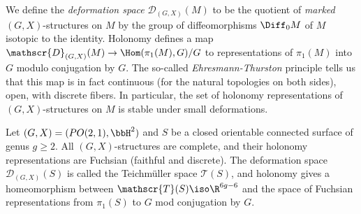 \documentclass{article}
\begin{document}
We define the \textit{deformation space} $\mathscr{D}_{(G,X)}(M)$ to be the quotient of \textit{marked} $(G,X)$-structures on $M$ by the group of diffeomorphisms $\Diff_0M$ of $M$ isotopic to the identity. Holonomy defines a map $\mathscr{D}_{(G,X)}(M) \to \Hom(\pi_1(M),G)/G$ to representations of $\pi_1(M)$ into $G$ modulo conjugation by $G$. The so-called \textit{Ehresmann-Thurston} principle tells us that this map is in fact continuous (for the natural topologies on both sides), open, with discrete fibers. In particular, the set of holonomy representations of $(G,X)$-structures on $M$ is stable under small deformations.

\begin{example}
	Let $(G,X) = (PO(2,1), \bbH^2)$ and $S$ be a closed orientable connected surface of genus $g \geq 2$. All $(G,X)$-structures are complete, and their holonomy representations are Fuchsian (faithful and discrete). The deformation space $\mathscr{D}_{(G,X)}(S)$ is called the Teichm\"uller space $\mathscr{T}(S)$, and holonomy gives a homeomorphism between $\mathscr{T}(S) \iso \R^{6g - 6}$ and the space of Fuchsian representations from $\pi_1(S)$ to $G$ mod conjugation by $G$.
\end{example}
\end{document}

